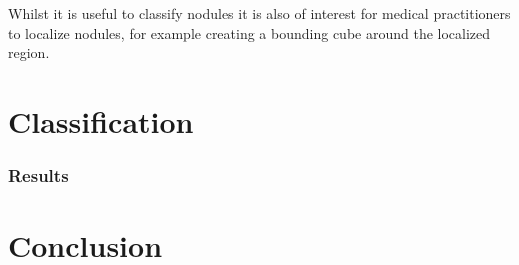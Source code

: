\documentclass{article}%
\begin{document}
Whilst it is useful to classify nodules it is also of interest for medical practitioners to localize nodules, for example creating a bounding cube around the localized region.

\section{Classification}

\subsubsection{Results}

\section{Conclusion}



\end{document}
